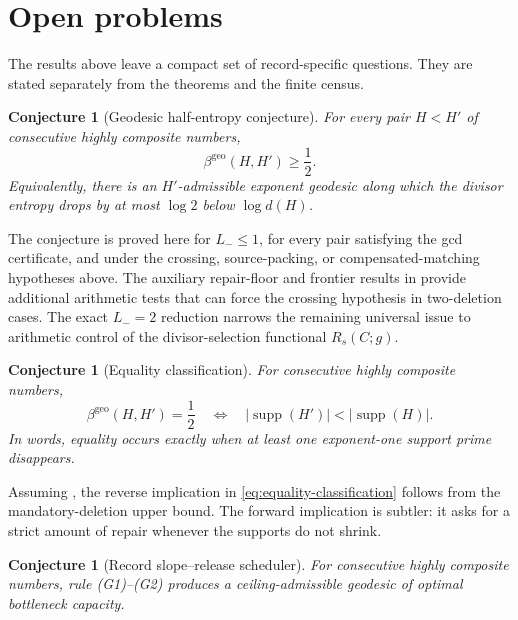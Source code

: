\documentclass[11pt]{article}
\numberwithin{equation}{section}
\theoremstyle{blueplain}
\newtheorem{conjecture}[theorem]{Conjecture}
\theoremstyle{bluedef}
\newcommand{\betageo}{\beta^{\mathrm{geo}}}
\newcommand{\supp}{\operatorname{supp}}
\begin{document}
\section{Open problems}
\label{sec:open}

The results above leave a compact set of record-specific questions.  They are stated separately from the theorems and the finite census.

\begin{conjecture}[Geodesic half-entropy conjecture]
\label{conj:geodesic-half}
For every pair $H<H'$ of consecutive highly composite numbers,
\begin{equation}
 \boxed{\betageo(H,H')\ge\frac12.}
 \label{eq:geodesic-half-conjecture}
\end{equation}
Equivalently, there is an $H'$-admissible exponent geodesic along which the divisor entropy drops by at most $\log2$ below $\log d(H)$.
\end{conjecture}

The conjecture is proved here for $L_-\le1$, for every pair satisfying the gcd certificate, and under the crossing, source-packing, or compensated-matching hypotheses above.  The auxiliary repair-floor and frontier results in  provide additional arithmetic tests that can force the crossing hypothesis in two-deletion cases.  The exact $L_-=2$ reduction narrows the remaining universal issue to arithmetic control of the divisor-selection functional $R_s(C;g)$.

\begin{conjecture}[Equality classification]
\label{conj:equality-classification}
For consecutive highly composite numbers,
\begin{equation}
 \betageo(H,H')=\frac12
 \quad\Longleftrightarrow\quad
 |\supp(H')|<|\supp(H)|.
 \label{eq:equality-classification}
\end{equation}
In words, equality occurs exactly when at least one exponent-one support prime disappears.
\end{conjecture}

Assuming , the reverse implication in \eqref{eq:equality-classification} follows from the mandatory-deletion upper bound.  The forward implication is subtler: it asks for a strict amount of repair whenever the supports do not shrink.

\begin{conjecture}[Record slope--release scheduler]
\label{conj:greedy}
For consecutive highly composite numbers, rule \textup{(G1)--(G2)} produces a ceiling-admissible geodesic of optimal bottleneck capacity.
\end{conjecture}
\end{document}

